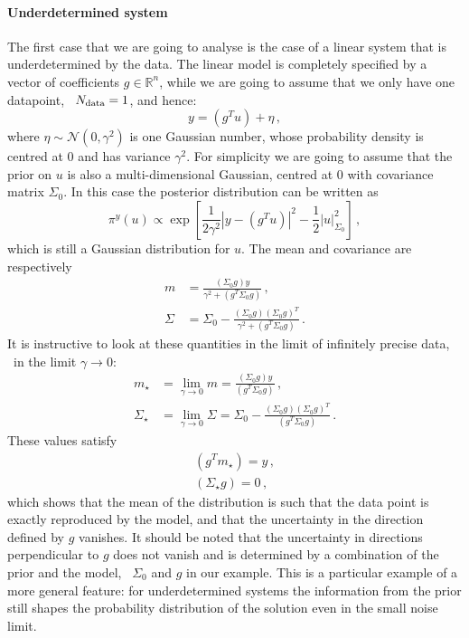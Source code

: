 \paragraph{Underdetermined system}
The first case that we are going to analyse is the case of a linear system that
is underdetermined by the data. The linear model is completely specified by a
vector of coefficients $g\in \mathbb{R}^n$, while we are going to assume that we
only have one datapoint, \ie\ $N_{\rm data}=1$, and hence:
\begin{equation}
  \label{eq:LinearModelEx}
  y = (g^T u) + \eta\, ,
\end{equation}
where $\eta \sim \mathcal{N}(0,\gamma^2)$ is one Gaussian number, whose
probability density is centred at $0$ and has variance $\gamma^2$. For
simplicity we are going to assume that the prior on $u$ is also a
multi-dimensional Gaussian, centred at $0$ with covariance matrix $\Sigma_0$. In
this case the posterior distribution can be written as
\begin{equation}
  \label{eq:GaussPostExplicit}
    \pi^y(u) \propto \exp \left[
    \frac{1}{2\gamma^2} \left|y - (g^T u) \right|^2 - \frac12 \left|
      u
    \right|_{\Sigma_0}^2 
    \right]\, ,
\end{equation}
which is still a Gaussian distribution for $u$. The mean and covariance are
respectively
\begin{align}
  m &= \frac{(\Sigma_0 g) y}{\gamma^2 + (g^T \Sigma_0 g)}\, , \\
  \Sigma &= \Sigma_0 - 
  \frac{(\Sigma_0 g) (\Sigma_0 g)^T}{\gamma^2 + (g^T \Sigma_0 g)}\, .
\end{align}
It is instructive to look at these quantities in the limit of infinitely precise data, \ie\ in the limit $\gamma\to 0$:
\begin{align}
  m_\star &= 
  \lim_{\gamma\to 0} m
  = \frac{(\Sigma_0 g) y}{(g^T \Sigma_0 g)}\, , \\
  \Sigma_\star &= 
  \lim_{\gamma\to 0} \Sigma 
  = \Sigma_0 - 
  \frac{(\Sigma_0 g) (\Sigma_0 g)^T}{(g^T \Sigma_0 g)}\, .
\end{align}
These values satisfy
\begin{align}
  (g^T m_\star) = y \, , \\
  (\Sigma_\star g) = 0 \, ,
\end{align}
which shows that the mean of the distribution is such that the data point is
exactly reproduced by the model, and that the uncertainty in the direction
defined by $g$ vanishes. It should be noted that the uncertainty in directions
perpendicular to $g$ does not vanish and is determined by a combination of the
prior and the model, \viz\ $\Sigma_0$ and $g$ in our example. This is a
particular example of a more general feature: for underdetermined systems the
information from the prior still shapes the probability distribution of the
solution even in the small noise limit.  

